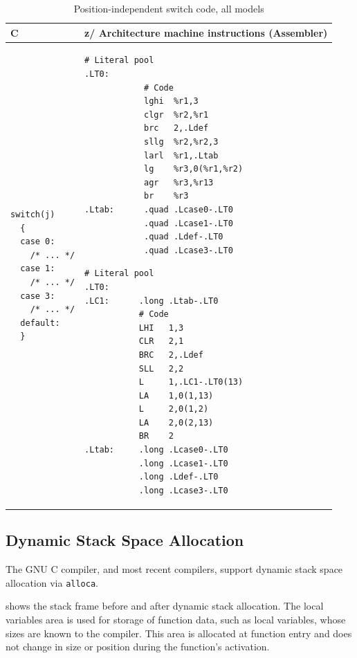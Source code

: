 \documentclass[USenglish,fontsize=11pt,twoside,%
  toc=bib,toc=idx,toc=graduated,numbers=noendperiod,
  bookmarks=true,
  bookmarksnumbered=true,
  bookmarksopen=true,
  bookmarksopenlevel=1,
  breaklinks=true,
  colorlinks=true,
  linkcolor=black,
  pdfpagelayout={TwoPageRight},
  pdfusetitle=true
]{scrreprt}
\newcommand{\ARCH}{z/\kern-1pt Ar\-chi\-tec\-ture}
\newcommand{\ARCH}{ESA/390}
\newenvironment{DIFnomarkup}{}{} %
\begin{document}
\begin{table}
  \centering
  \begin{DIFnomarkup}
  \begin{tabular}{p{}p{}}
    \toprule
    C & \ARCH{} machine instructions (Assembler) \\
    \midrule
\begin{lstlisting}[style=short]
switch(j)
  {
  case 0:
    /* ... */
  case 1:
    /* ... */
  case 3:
    /* ... */
  default:
  }
\end{lstlisting}
    &
\ifzseries
\begin{lstlisting}[style=short,language=simpleasm]
            # Literal pool
.LT0:
            # Code
            lghi  %r1,3
            clgr  %r2,%r1
            brc   2,.Ldef
            sllg  %r2,%r2,3
            larl  %r1,.Ltab
            lg    %r3,0(%r1,%r2)
            agr   %r3,%r13
            br    %r3
.Ltab:      .quad .Lcase0-.LT0
            .quad .Lcase1-.LT0
            .quad .Ldef-.LT0
            .quad .Lcase3-.LT0
\end{lstlisting}
\else
\begin{lstlisting}[style=short,language=simpleasm]
           # Literal pool
.LT0:
.LC1:      .long .Ltab-.LT0
           # Code
           LHI   1,3
           CLR   2,1
           BRC   2,.Ldef
           SLL   2,2
           L     1,.LC1-.LT0(13)
           LA    1,0(1,13)
           L     2,0(1,2)
           LA    2,0(2,13)
           BR    2
.Ltab:     .long .Lcase0-.LT0
           .long .Lcase1-.LT0
           .long .Ldef-.LT0
           .long .Lcase3-.LT0
\end{lstlisting}
\fi \\
    \bottomrule
  \end{tabular}
  \end{DIFnomarkup}
  \caption{Position-independent switch code, all models}
  \label{tab:indswitch}
\end{table}

\subsection{Dynamic Stack Space Allocation}
\label{dynamicstack}
The GNU C compiler, and most recent compilers, support dynamic stack
space allocation via \texttt{alloca}.

 shows the stack frame before and after dynamic
stack allocation.  The local variables area is used for storage of
function data, such as local variables, whose sizes are known to the
compiler.  This area is allocated at function entry and does not
change in size or position during the function's activation.
\end{document}
